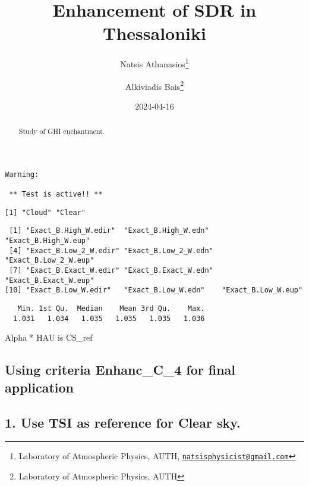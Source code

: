 \documentclass[
  10pt,
  a4paper,oneside]{article}
\title{Enhancement of SDR in Thessaloniki}
\author{Natsis Athanasios\footnote{Laboratory of Atmospheric Physics, AUTH, \href{mailto:natsisphysicist@gmail.com}{\nolinkurl{natsisphysicist@gmail.com}}} \and Alkiviadis Bais\footnote{Laboratory of Atmospheric Physics, AUTH}}
\date{2024-04-16}
\begin{document}
\maketitle
\begin{abstract}
Study of GHI enchantment.
\end{abstract}

{
\hypersetup{linkcolor=}
\setcounter{tocdepth}{4}
\tableofcontents
}
\begin{verbatim}
Warning: 

 ** Test is active!! ** 
\end{verbatim}

\begin{verbatim}
[1] "Cloud" "Clear"
\end{verbatim}

\begin{verbatim}
 [1] "Exact_B.High_W.edir"  "Exact_B.High_W.edn"   "Exact_B.High_W.eup"  
 [4] "Exact_B.Low_2_W.edir" "Exact_B.Low_2_W.edn"  "Exact_B.Low_2_W.eup" 
 [7] "Exact_B.Exact_W.edir" "Exact_B.Exact_W.edn"  "Exact_B.Exact_W.eup" 
[10] "Exact_B.Low_W.edir"   "Exact_B.Low_W.edn"    "Exact_B.Low_W.eup"   
\end{verbatim}

\begin{verbatim}
   Min. 1st Qu.  Median    Mean 3rd Qu.    Max. 
  1.031   1.034   1.035   1.035   1.035   1.036 
\end{verbatim}

Alpha * HAU is CS\_ref

\hypertarget{using-criteria-enhanc_c_4-for-final-application}{%
\subsection{\texorpdfstring{Using criteria \textbf{Enhanc\_C\_4} for final application}{Using criteria Enhanc\_C\_4 for final application}}\label{using-criteria-enhanc_c_4-for-final-application}}

\hypertarget{use-tsi-as-reference-for-clear-sky.}{%
\subsection{1. Use TSI as reference for Clear sky.}\label{use-tsi-as-reference-for-clear-sky.}}
\end{document}
